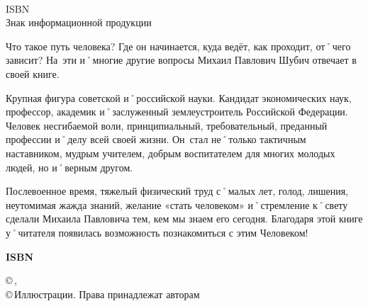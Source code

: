 \begin{titlepage}
	\vfill
	\noindent
	\hspace{1em}\hphantom{\AuthorMark}
	{\bfseries\AuthorAbbrB}
	
	\noindent
	\AuthorMark\hspace{1em}
	\begin{minipage}[t]{\linewidth-1em-\widthof{\AuthorMark}}
		{\hspace{1.5em}\BibInfo\\[1ex]}
		{\hspace{1.5em}ISBN \ISBN\\}
		{\hspace{1.5em}Знак информационной продукции \large\textbf{\AgeLimit}}
	\end{minipage}
	
	\vfill
	\noindent
	\hspace{1em}\hphantom{\AuthorMark}
	\begin{minipage}[t]{\linewidth-1em-\widthof{\AuthorMark}}
		\footnotesize\hspace{1.5em}	Что такое путь человека? Где он начинается, куда ведёт, как проходит, от˚чего зависит? На~эти и˚многие другие вопросы Михаил Павлович Шубич отвечает в своей книге.

\hspace{1.5em}Крупная фигура советской и˚российской науки. Кандидат экономических наук, профессор, академик и˚заслуженный землеустроитель Российской Федерации. Человек несгибаемой воли, принципиальный, требовательный, преданный профессии и˚делу всей своей жизни. Он~стал не˚только тактичным наставником, мудрым учителем, добрым воспитателем для многих молодых людей, но и˚верным другом.

\hspace{1.5em}Послевоенное время, тяжелый физический труд с˚малых лет, голод, лишения, неутомимая жажда знаний, желание «стать человеком» и˚стремление к˚свету сделали Михаила Павловича тем, кем мы знаем его сегодня. Благодаря этой книге у˚читателя появилась возможность познакомиться с этим Человеком!
	\end{minipage}
		
	\noindent	
	\begin{flushright}
		\bibInd{\UDK}{\BBK}{}	
	\end{flushright}
	
	\vfill
	\noindent
	\parbox[b]{.5\linewidth}{\small\bfseries ISBN \ISBN}
	\hfill
	\parbox[b]{.45\linewidth}
	{\raggedright\small
	 ©\,\AuthorAbbrA, \YearPub\\
	 ©\,Иллюстрации. Права принадлежат авторам	
	}
	
\end{titlepage}
